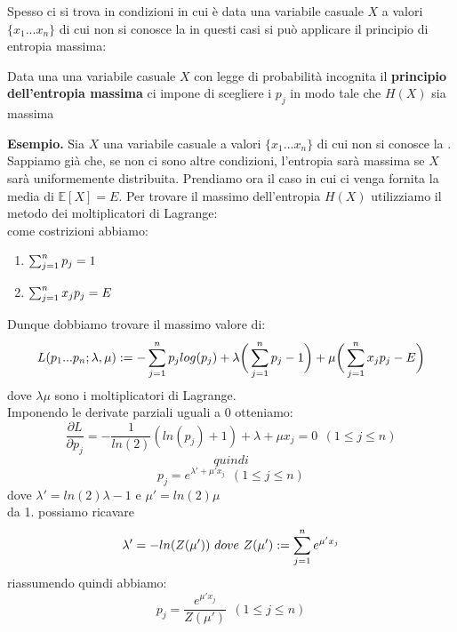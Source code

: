 Spesso ci si trova in condizioni in cui è data una variabile casuale $X$ a valori $\{ x_1...x_n \}$ di cui non si conosce la \lep  in questi casi si può applicare il principio di entropia massima:\\
\begin{defi}
Data una una variabile casuale $X$ con legge di probabilità \lep  incognita il \textbf{principio dell'entropia massima} ci impone di scegliere i $p_j$ in modo tale che $H(X)$ sia massima
\end{defi}
\textbf{Esempio.} 
Sia $X$ una variabile casuale a valori $\{ x_1...x_n \}$ di cui non si conosce la \lep . Sappiamo già che, se non ci sono altre condizioni, l'entropia sarà massima se $X$ sarà uniformemente distribuita. Prendiamo ora il caso in cui ci venga fornita la media di $\mathbb{E}[ X]=E$. Per trovare il massimo dell'entropia $H(X)$ utilizziamo il metodo dei  moltiplicatori di Lagrange:\\
come costrizioni abbiamo:
\begin{enumerate}
\item $\sum_{j=1}^n p_j=1$
\item $\sum_{j=1}^n x_j p_j=E$
\end{enumerate}
Dunque dobbiamo trovare il massimo valore di:
\begin{equation}
L(p_1...p_n;\lambda,\mu ):= -\sum_{j=1}^n p_j log(p_j) + \lambda \bigg( \sum_{j=1}^n p_j -1 \bigg) + \mu \bigg( \sum_{j=1}^n x_j p_j - E \bigg)
\end{equation}
dove $\lambda \mu$ sono i moltiplicatori di Lagrange.\\
Imponendo le derivate parziali uguali a 0 otteniamo:
$$\frac{\partial L}{\partial p_j}=-\frac{1}{ln(2)}(ln(p_j)+1)+\lambda + \mu x_j=0 \ \  (1\leq j \leq n) $$
$$quindi$$
$$p_j=e^{\lambda ' + \mu ' x_j} \ \ (1\leq j \leq n)$$
dove $\lambda ' = ln(2) \lambda -1 $ e $\mu ' = ln(2) \mu$\\
da 1. possiamo ricavare 
$$\lambda ' = - ln(Z( \mu ')) \ dove \ Z( \mu '):= \sum_{j=1}^n e^{\mu ' x_j}$$
riassumendo quindi abbiamo:
\begin{equation}
p_j=\frac{e^{\mu ' x_j}}{Z( \mu ')} \ \ (1\leq j \leq n)
\end{equation}



